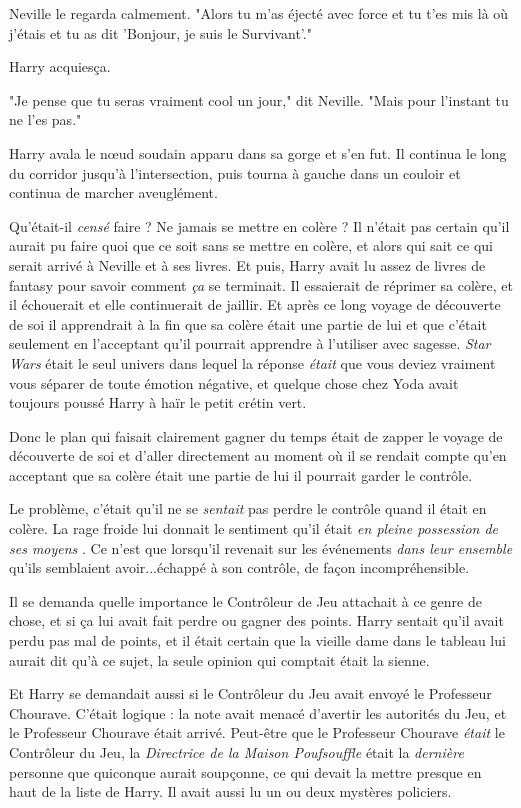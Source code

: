 Neville le regarda calmement. "Alors tu m'as éjecté avec force et tu t'es mis là où j'étais et tu as dit 'Bonjour, je suis le Survivant'."

Harry acquiesça.

"Je pense que tu seras vraiment cool un jour," dit Neville. "Mais pour l'instant tu ne l'es pas."

Harry avala le nœud soudain apparu dans sa gorge et s'en fut. Il continua le long du corridor jusqu'à l'intersection, puis tourna à gauche dans un couloir et continua de marcher aveuglément.

Qu'était-il \emph{censé}  faire ? Ne jamais se mettre en colère ? Il n'était pas certain qu'il aurait pu faire quoi que ce soit sans se mettre en colère, et alors qui sait ce qui serait arrivé à Neville et à ses livres. Et puis, Harry avait lu assez de livres de fantasy pour savoir comment \emph{ça}  se terminait. Il essaierait de réprimer sa colère, et il échouerait et elle continuerait de jaillir. Et après ce long voyage de découverte de soi il apprendrait à la fin que sa colère était une partie de lui et que c'était seulement en l'acceptant qu'il pourrait apprendre à l'utiliser avec sagesse. \emph{Star Wars}  était le seul univers dans lequel la réponse \emph{était}  que vous deviez vraiment vous séparer de toute émotion négative, et quelque chose chez Yoda avait toujours poussé Harry à haïr le petit crétin vert.

Donc le plan qui faisait clairement gagner du temps était de zapper le voyage de découverte de soi et d'aller directement au moment où il se rendait compte qu'en acceptant que sa colère était une partie de lui il pourrait garder le contrôle.

Le problème, c'était qu'il ne se \emph{sentait}  pas perdre le contrôle quand il était en colère. La rage froide lui donnait le sentiment qu'il était \emph{en pleine possession de ses moyens} . Ce n'est que lorsqu'il revenait sur les événements \emph{dans leur ensemble}  qu'ils semblaient avoir...échappé à son contrôle, de façon incompréhensible.

Il se demanda quelle importance le Contrôleur de Jeu attachait à ce genre de chose, et si ça lui avait fait perdre ou gagner des points. Harry sentait qu'il avait perdu pas mal de points, et il était certain que la vieille dame dans le tableau lui aurait dit qu'à ce sujet, la seule opinion qui comptait était la sienne.

Et Harry se demandait aussi si le Contrôleur du Jeu avait envoyé le Professeur Chourave. C'était logique : la note avait menacé d'avertir les autorités du Jeu, et le Professeur Chourave était arrivé. Peut-être que le Professeur Chourave \emph{était}  le Contrôleur du Jeu, la \emph{Directrice de la Maison Poufsouffle}  était la \emph{dernière}  personne que quiconque aurait soupçonne, ce qui devait la mettre presque en haut de la liste de Harry. Il avait aussi lu un ou deux mystères policiers.

